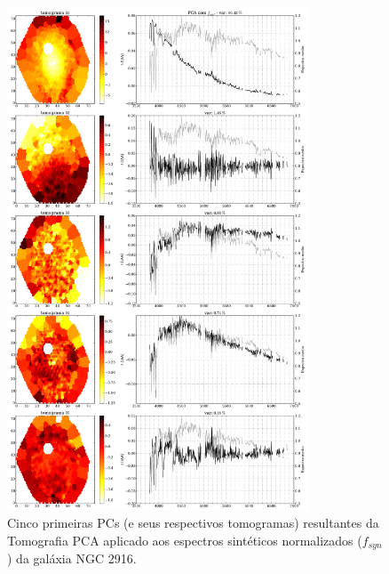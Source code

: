 \begin{figure}
    \includegraphics[width=0.8\textwidth]{figuras/K0277-tomo-syn-norm.pdf}
    \caption[Tomogramas de 1 a 5 da gal\'axia NGC 2916 - $f_{syn}$ .]
    {Cinco primeiras PCs (e seus respectivos tomogramas) resultantes da Tomografia PCA aplicado aos espectros
    sintéticos normalizados ($f_{syn}$) da galáxia NGC 2916.}
    \label{fig:K0277tomofsynnorm}
\end{figure}


